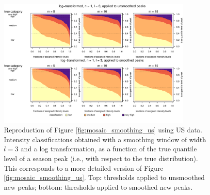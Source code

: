 \documentclass{article}
\begin{document}
\begin{figure}[h!]
\begin{center}
\includegraphics[width=0.87\textwidth]{figure/mosaic_log_smoothed_fr_fancy.pdf}
\caption{Reproduction of Figure \ref{fig:mosaic_smoothing_us} using US data. Intensity classifications obtained with a smoothing window of width $l = 3$ and a log transformation, as a function of the true quantile level of a season peak (i.e., with respect to the true distribution). This corresponds to a more detailed version of Figure \ref{fig:mosaic_smoothing_us}. Top: thresholds applied to unsmoothed new peaks; bottom: thresholds applied to smoothed new peaks.}
\label{fig:mosaic_smoothing_fancy_us}
\end{center}
\end{figure}
\end{document}
